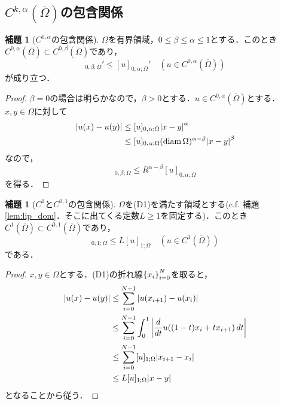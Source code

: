 \documentclass[a4paper]{ltjsarticle}
\newcommand{\Om}{\Omega}
\newcommand{\Ombar}{\overline{\Omega}}
\newcommand{\1}{\mathbbm{1}}
\DeclareMathOperator{\diam}{\mathrm{diam}}
\numberwithin{equation}{section}
\theoremstyle{definition}
\newtheorem{lem}[thm]{補題}
\begin{document}
\subsection{\texorpdfstring{$C^{k,\alpha}(\Ombar)$}{TEXT}の包含関係}
\begin{lem}[$C^{0,\alpha}$の包含関係]\label{lem:holder_inclusion}
    $\Om$を有界領域，$0\leq \beta\leq \alpha\leq 1$とする．このとき$C^{0,\alpha}(\Ombar)\subset C^{0,\beta}(\Ombar)$であり，
    \begin{equation}
        [u]_{0,\beta;\Om}'\leq [u]_{0,\alpha;\Om}'\quad (u\in C^{0,\alpha}(\Ombar))
    \end{equation}
    が成り立つ．
\end{lem}
\begin{proof}
    $\beta=0$の場合は明らかなので，$\beta>0$とする．$u\in C^{0,\alpha}(\Ombar)$とする．$x,y\in\Om$に対して
    \begin{align}
        \abs{u(x)-u(y)}&\leq [u]_{0,\alpha;\Om}\abs{x-y}^\alpha\\
        &\leq [u]_{0,\alpha;\Om}(\diam \Om)^{\alpha-\beta}\abs{x-y}^\beta
    \end{align}
    なので，
    \begin{equation}
        [u]_{0,\beta;\Om}\leq R^{\alpha-\beta} [u]_{0,\alpha;\Om}
    \end{equation}
    を得る．
\end{proof}
\begin{lem}[$C^{1}$と$C^{0,1}$の包含関係]\label{lem:C1v.s.C01}
    $\Om$を(D1)を満たす領域とする(c.f. 補題\ref{lem:lip_dom}．そこに出てくる定数$L\geq1$を固定する)．このとき$C^{1}(\Ombar)\subset C^{0,1}(\Ombar)$であり，
    \begin{equation}
        [u]_{0,1;\Om}\leq L[u]_{1;\Om} \quad(u\in C^1(\Ombar))
    \end{equation}
    である．
\end{lem}
\begin{proof}
    $x,y\in\Om$とする．(D1)の折れ線$\qty{x_i}_{i=0}^N$を取ると，
    \begin{align}
        \abs{u(x)-u(y)}&\leq \sum_{i=0}^{N-1}\abs{u(x_{i+1})-u(x_i)}\\
        &\leq \sum_{i=0}^{N-1}\int_{0}^{1}\abs{\frac{d}{dt}u((1-t)x_{i}+tx_{i+1})\,dt}\\
        &\leq \sum_{i=0}^{N-1}[u]_{1;\Om}\abs{x_{i+1}-x_i}\\
        &\leq L[u]_{1;\Om}\abs{x-y}
    \end{align}
    となることから従う．
\end{proof}
\end{document}
